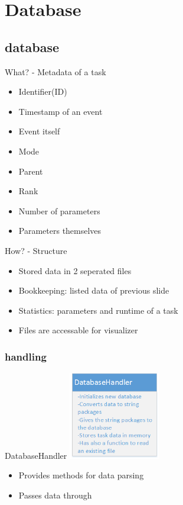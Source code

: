 \section{Database}

\subsection{database}

	\begin{frame}{What? - Metadata of a task}
		\begin{itemize}
		\item Identifier(ID)
		\item Timestamp of an event
		\item Event itself
		\item Mode
		\item Parent
		\item Rank
		\item Number of parameters
		\item Parameters themselves
		\end{itemize}
	\end{frame}
	
	\begin{frame}{How? - Structure}
		\begin{itemize}
		\item Stored data in 2 seperated files
		\item Bookkeeping: listed data of previous slide
		\item Statistics: parameters and runtime of a task
		\item Files are accessable for visualizer
		\end{itemize}
	\end{frame}
\subsubsection{handling}
	\begin{frame}{DatabaseHandler}
	\includegraphics[width=0.3\textwidth]{images/databasehandler.png}
	\begin{itemize}
		\item Provides methods for data parsing
		\item Passes data through
		
	\end{itemize}
	\end{frame}
	
